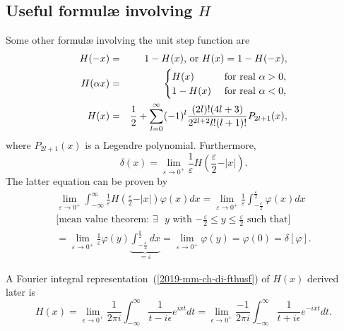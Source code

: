 \subsection{Useful formul\ae{} involving $H$}

Some other formul\ae{}  involving the unit step function
are
 \begin{eqnarray}
H (-x)&=& 1-H(x)  \text{, or }   H(x) = 1 - H(-x),
\\
H (\alpha x)&=&
\begin{cases}
H (x) & \text{ for real } \alpha > 0,\\
1-H (x) & \text{ for real } \alpha < 0,
\end{cases}
\\
H (x)
&=&{1\over 2}
+
\sum_{l=0}^\infty (-1)^l {(2l)!(4l+3)\over 2^{2l+2}l!(l+1)!}
P_{2l+1} (x),
 \end{eqnarray}
where $P_{2l+1} (x)$ is a Legendre polynomial.
Furthermore,
\begin{equation}
\delta(x)=
\lim_{\varepsilon \rightarrow 0^+}
\frac{1}{\varepsilon } H\left( \frac{\varepsilon }{2} -\vert x\vert\right) .
\end{equation}
{\color{OliveGreen}
\bproof
The latter equation can
be proven by
\begin{equation}
\begin{split}
\lim_{\varepsilon \rightarrow 0^+}  \int_{-\infty}^\infty
\frac{1}{\varepsilon } H\left( \frac{\varepsilon }{2} -\vert x\vert\right) \varphi(x) dx
=
\lim_{\varepsilon \rightarrow 0^+} \frac{1}{\varepsilon } \int_{-\frac{\varepsilon}{2}}^{\frac{\varepsilon}{2}}
\varphi(x) dx
\\
\textrm{[mean value theorem: $\exists$  $y$ with $-\frac{\varepsilon}{2}\le y \le \frac{\varepsilon}{2}$ such that]} \\
=\lim_{\varepsilon \rightarrow 0^+} \frac{1}{\varepsilon }\varphi(y) \underbrace{\int_{-\frac{\varepsilon}{2}}^{\frac{\varepsilon}{2}} dx}_{=\varepsilon }
=\lim_{\varepsilon \rightarrow 0^+}  \varphi(y)  =   \varphi(0) =\delta [\varphi ].
\end{split}
\end{equation}
\eproof
}

A Fourier integral representation~(\ref{2019-mm-ch-di-fthusf}) of $H(x)$ derived later
is
 \begin{equation}
H (x)
=
\lim_{\epsilon \rightarrow 0^+} \frac {1}{2\pi i}
\int_{-\infty}^\infty
 \frac{1}{t - i\epsilon}e^{ ixt} dt
=
\lim_{\epsilon \rightarrow 0^+} \frac{- 1}{2\pi i}
\int_{-\infty}^\infty
 \frac{1}{t + i\epsilon}e^{- ixt} dt
.
 \end{equation}



